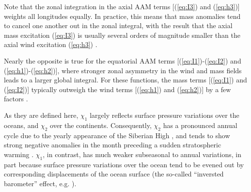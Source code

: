Note that the zonal integration in the axial AAM terms [(\ref{eq:I3}) and (\ref{eq:h3})] weights all longitudes equally.
In practice, this means that mass anomalies tend to cancel one another out in the zonal integral, with the result that the axial mass excitation (\ref{eq:I3}) is usually several orders of magnitude smaller than the axial wind excitation (\ref{eq:h3}) \citep{barnesetal1983}.

Nearly the opposite is true for the equatorial AAM terms [(\ref{eq:I1})-(\ref{eq:I2}) and (\ref{eq:h1})-(\ref{eq:h2})], where stronger zonal asymmetry in the wind and mass fields leads to a larger global integral.
For these functions, the mass terms [(\ref{eq:I1}) and (\ref{eq:I2})] typically outweigh the wind terms [(\ref{eq:h1}) and (\ref{eq:h2})] by a few factors \citep{barnesetal1983}.

As they are defined here, $\chi_1$ largely reflects surface pressure variations over the oceans, and $\chi_2$ over the continents.
Consequently, $\chi_2$ has a pronounced annual cycle due to the yearly appearance of the Siberian High \citep{dobslawetal2010}, and tends to show strong negative anomalies in the month preceding a sudden stratospheric warming \citep{Neef2014}.
$\chi_1$, in contrast, has much weaker subseasonal to annual variations, in part because surface pressure variations over the ocean tend to be evened out by corresponding displacements of the ocean surface (the so-called ``inversted barometer'' effect, e.g. \citet{salsteinrosen1989}).


